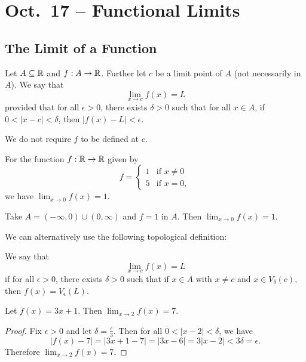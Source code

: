 \chapter{Oct.~17 -- Functional Limits}

\section{The Limit of a Function}
\begin{definition}
  Let $A \subseteq \mathbb{R}$ and $f : A \to \mathbb{R}$. Further let
  $c$ be a limit point of $A$ (not necessarily in $A$).
  We say that
  \[\lim_{x \to c} f(x) = L\]
  provided that for all $\epsilon > 0$, there exists
  $\delta > 0$ such that for all $x \in A$, if
  $0 < |x - c| < \delta$, then
  $|f(x) - L| < \epsilon$.
\end{definition}

\begin{remark}
  We do not require $f$ to be defined at $c$.
\end{remark}

\begin{example}
  For the function $f : \mathbb{R} \to \mathbb{R}$ given by
  \[
    f = \begin{cases}
      1 & \text{if $x \ne 0$} \\
      5 & \text{if $x = 0$},
    \end{cases}
  \]
  we have $\lim_{x \to 0} f(x) = 1$.
\end{example}

\begin{example}
  Take $A = (-\infty, 0) \cup (0, \infty)$ and $f = 1$
  in $A$. Then $\lim_{x \to 0} f(x) = 1$.
\end{example}

We can alternatively use the following topological
definition:
\begin{definition}
  We say that
  \[\lim_{x \to c}f(x) = L\]
  if for all $\epsilon > 0$, there exists $\delta > 0$
  such that if $x \in A$ with $x \ne c$ and
  $x \in V_\delta(c)$, then $f(x) = V_\epsilon(L)$.
\end{definition}

\begin{exercise}
  Let $f(x) = 3x + 1$. Then $\lim_{x \to 2} f(x) = 7$.
\end{exercise}

\begin{proof}
  Fix $\epsilon > 0$ and let $\delta = \frac{\epsilon}{3}$.
  Then for all $0 < |x - 2| < \delta$, we have
  \[|f(x) - 7| = |3x + 1 - 7| = |3x - 6| = 3|x - 2|
  < 3\delta = \epsilon.\]
  Therefore $\lim_{x \to 2} f(x) = 7$.
\end{proof}

